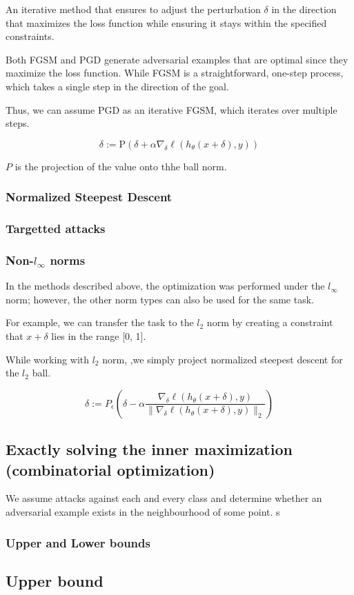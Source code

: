 An iterative method that ensures to adjust the perturbation $\delta$ in the direction that maximizes the loss function 
while ensuring it stays within the specified constraints.

Both FGSM and PGD generate adversarial examples that are optimal since they maximize the loss function.
While FGSM is a straightforward, one-step process, which takes a single step in the direction of the goal.

Thus, we can assume PGD as an iterative FGSM, which iterates over multiple steps.

\[\delta := \text{P}(\delta + \alpha \nabla_{\delta} \ell(h_\theta(x + \delta), y))\]

$P$ is the projection of the value onto thhe ball norm.
\subsubsection{Normalized Steepest Descent}

\subsubsection{Targetted attacks}

\subsubsection{Non-$l_{\infty}$ norms}

In the methods described above, the optimization was performed under the $l_{\infty}$ norm; however, 
the other norm types can also be used for the same task.

For example, we can transfer the task to the $l_2$ norm by creating a constraint that $x+\delta$ lies in the range [0, 1].

While working with $l_2$ norm, ,we simply project normalized steepest descent for the $l_2$ ball. 

\[\delta := P_{\epsilon}\left(\delta - \alpha \frac{\nabla_{\delta} \ell(h_{\theta}(x + \delta), y)}{\|\nabla_{\delta} \ell(h_{\theta}(x + \delta), y)\|_2}\right)\]


\subsection{Exactly solving the inner maximization (combinatorial optimization)}

We assume attacks against each and every class and determine whether an adversarial example exists in the neighbourhood of some point.
s
\subsubsection{Upper and Lower bounds}
\subsection{Upper bound}

